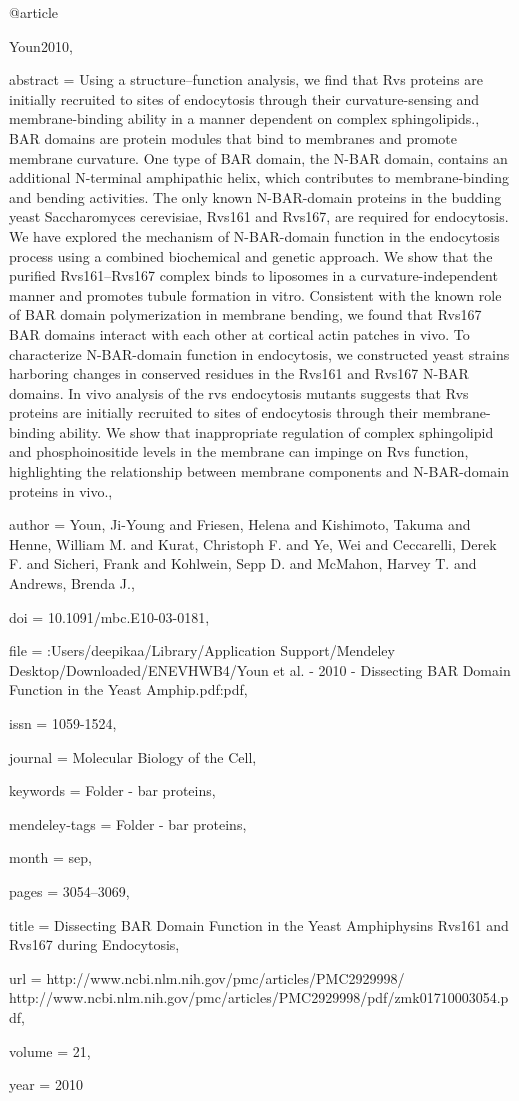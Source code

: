@article{Youn2010,

abstract = {Using a structure–function analysis, we find that Rvs proteins are initially recruited to sites of endocytosis through their curvature-sensing and membrane-binding ability in a manner dependent on complex sphingolipids., BAR domains are protein modules that bind to membranes and promote membrane curvature. One type of BAR domain, the N-BAR domain, contains an additional N-terminal amphipathic helix, which contributes to membrane-binding and bending activities. The only known N-BAR-domain proteins in the budding yeast Saccharomyces cerevisiae, Rvs161 and Rvs167, are required for endocytosis. We have explored the mechanism of N-BAR-domain function in the endocytosis process using a combined biochemical and genetic approach. We show that the purified Rvs161–Rvs167 complex binds to liposomes in a curvature-independent manner and promotes tubule formation in vitro. Consistent with the known role of BAR domain polymerization in membrane bending, we found that Rvs167 BAR domains interact with each other at cortical actin patches in vivo. To characterize N-BAR-domain function in endocytosis, we constructed yeast strains harboring changes in conserved residues in the Rvs161 and Rvs167 N-BAR domains. In vivo analysis of the rvs endocytosis mutants suggests that Rvs proteins are initially recruited to sites of endocytosis through their membrane-binding ability. We show that inappropriate regulation of complex sphingolipid and phosphoinositide levels in the membrane can impinge on Rvs function, highlighting the relationship between membrane components and N-BAR-domain proteins in vivo.},

author = {Youn, Ji-Young and Friesen, Helena and Kishimoto, Takuma and Henne, William M. and Kurat, Christoph F. and Ye, Wei and Ceccarelli, Derek F. and Sicheri, Frank and Kohlwein, Sepp D. and McMahon, Harvey T. and Andrews, Brenda J.},

doi = {10.1091/mbc.E10-03-0181},

file = {:Users/deepikaa/Library/Application Support/Mendeley Desktop/Downloaded/ENEVHWB4/Youn et al. - 2010 - Dissecting BAR Domain Function in the Yeast Amphip.pdf:pdf},

issn = {1059-1524},

journal = {Molecular Biology of the Cell},

keywords = {Folder - bar proteins},

mendeley-tags = {Folder - bar proteins},

month = {sep},

pages = {3054--3069},

title = {{Dissecting BAR Domain Function in the Yeast Amphiphysins Rvs161 and Rvs167 during Endocytosis}},

url = {http://www.ncbi.nlm.nih.gov/pmc/articles/PMC2929998/ http://www.ncbi.nlm.nih.gov/pmc/articles/PMC2929998/pdf/zmk01710003054.pdf},

volume = {21},

year = {2010}

}

